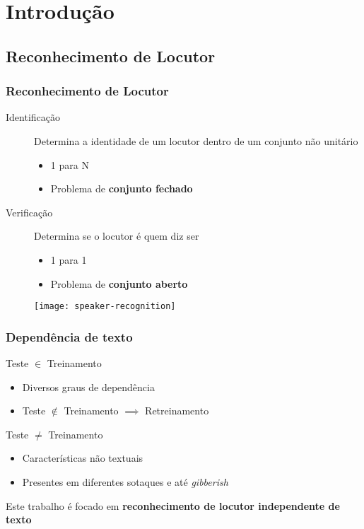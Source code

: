 \section{Introdução}
\label{sec:intro}

\contentscurrent

\subsection{Reconhecimento de Locutor}

\begin{frame}
\frametitle{Reconhecimento de Locutor}
\begin{description}
    \item[Identificação] Determina a identidade de um locutor dentro de um conjunto não unitário
    \begin{itemize}
        \item 1 para N
        \item Problema de \textbf{conjunto fechado}
    \end{itemize}
    \item[Verificação] Determina se o locutor é quem diz ser
    \begin{itemize}
        \item 1 para 1
        \item Problema de \textbf{conjunto aberto}
    \end{itemize}
\end{description}

\begin{figure}
    \centering
    \texttt{[image: speaker-recognition]}
\end{figure}
\end{frame}

\begin{frame}
\frametitle{Dependência de texto}
\begin{description}
    \item[Com] Teste $\in$ Treinamento
    \begin{itemize}
        \item Diversos graus de dependência
        \item Teste $\not\in$ Treinamento $\implies$ Retreinamento
    \end{itemize}
    \item[Sem] Teste $\neq$ Treinamento
    \begin{itemize}
        \item Características não textuais
        \item Presentes em diferentes sotaques e até \emph{gibberish}
    \end{itemize}
    \item Este trabalho é focado em \textbf{reconhecimento de locutor independente de texto}
\end{description}
\end{frame}

